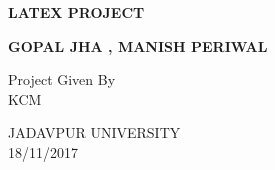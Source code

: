 \documentclass{article}
\begin{document}
	\begin{titlepage}
    \begin{center}
        \vspace*{2.5cm}
        
        \textbf{LATEX PROJECT
}
        
        \vspace{1.5cm}
        
        \textbf{GOPAL JHA , MANISH PERIWAL
}
        
        \vfill
        
        Project Given By\\
        KCM

        
        \vspace{0.8cm}
        
        JADAVPUR UNIVERSITY
\\
        18/11/2017\\
        
    \end{center}
\end{titlepage}
\end{document}
